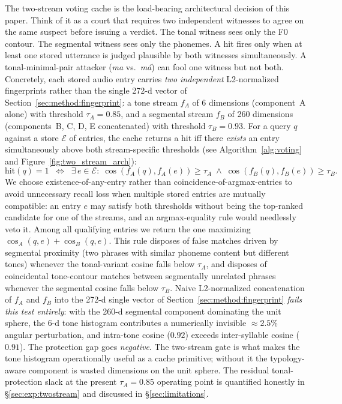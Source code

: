 \documentclass[a4paper,fleqn]{cas-dc}
\begin{document}
The two-stream voting cache is the load-bearing architectural decision of this paper. Think of it as a court that requires two independent witnesses to agree on the same suspect before issuing a verdict. The tonal witness sees only the F0 contour. The segmental witness sees only the phonemes. A hit fires only when at least one stored utterance is judged plausible by both witnesses simultaneously. A tonal-minimal-pair attacker (\emph{ma} vs.\ \emph{m\'a}) can fool one witness but not both. Concretely, each stored audio entry carries \emph{two independent} L2-normalized fingerprints rather than the single 272-d vector of Section~\ref{sec:method:fingerprint}: a tone stream $f_{A}$ of 6 dimensions (component~A alone) with threshold $\tau_{A} = 0.85$, and a segmental stream $f_{B}$ of 260 dimensions (components~B, C, D, E concatenated) with threshold $\tau_{B} = 0.93$. For a query $q$ against a store $\mathcal{E}$ of entries, the cache returns a hit iff there \emph{exists} an entry simultaneously above both stream-specific thresholds (see Algorithm~\ref{alg:voting} and Figure~\ref{fig:two_stream_arch}):
\begin{equation}
\mathrm{hit}(q) = 1 \;\;\Longleftrightarrow\;\;
  \exists\, e \in \mathcal{E} : \;\cos(f_{A}(q), f_{A}(e)) \geq \tau_{A} \;\wedge\; \cos(f_{B}(q), f_{B}(e)) \geq \tau_{B}.
\label{eq:twostream}
\end{equation}
We choose existence-of-any-entry rather than coincidence-of-argmax-entries to avoid unnecessary recall loss when multiple stored entries are mutually compatible: an entry $e$ may satisfy both thresholds without being the top-ranked candidate for one of the streams, and an argmax-equality rule would needlessly veto it. Among all qualifying entries we return the one maximizing $\cos_{A}(q,e) + \cos_{B}(q,e)$. This rule disposes of false matches driven by segmental proximity (two phrases with similar phoneme content but different tones) whenever the tonal-variant cosine falls below $\tau_{A}$, and disposes of coincidental tone-contour matches between segmentally unrelated phrases whenever the segmental cosine falls below $\tau_{B}$. Naive L2-normalized concatenation of $f_{A}$ and $f_{B}$ into the 272-d single vector of Section~\ref{sec:method:fingerprint} \emph{fails this test entirely}: with the 260-d segmental component dominating the unit sphere, the 6-d tone histogram contributes a numerically invisible $\approx 2.5\%$ angular perturbation, and intra-tone cosine ($0.92$) exceeds inter-syllable cosine ($0.91$). The protection gap goes \emph{negative}. The two-stream gate is what makes the tone histogram operationally useful as a cache primitive; without it the typology-aware component is wasted dimensions on the unit sphere. The residual tonal-protection slack at the present $\tau_{A} = 0.85$ operating point is quantified honestly in \S\ref{sec:exp:twostream} and discussed in \S\ref{sec:limitations}.
\end{document}
